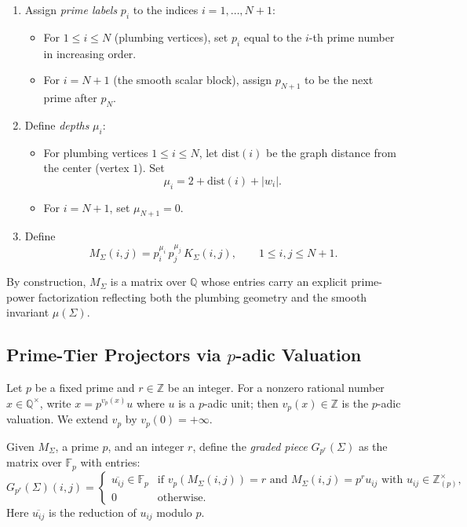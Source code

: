 \documentclass[11pt]{article}
\begin{document}
\begin{enumerate}[label=(\alph*),leftmargin=1.5em]
  \item Assign \emph{prime labels} $p_i$ to the indices $i=1,\dots,N+1$:
  \begin{itemize}[leftmargin=1em]
    \item For $1\le i\le N$ (plumbing vertices), set $p_i$ equal to the $i$-th prime number in increasing order.
    \item For $i = N+1$ (the smooth scalar block), assign $p_{N+1}$ to be the next prime after $p_N$.
  \end{itemize}
  \item Define \emph{depths} $\mu_i$:
  \begin{itemize}[leftmargin=1em]
    \item For plumbing vertices $1\le i\le N$, let $\mathrm{dist}(i)$ be the graph distance from the center (vertex $1$). Set
    \[
      \mu_i = 2 + \mathrm{dist}(i) + |w_i|.
    \]
    \item For $i=N+1$, set $\mu_{N+1} = 0$.
  \end{itemize}
  \item Define
  \[
    M_\Sigma(i,j) = p_i^{\mu_i}\,p_j^{\mu_j}\,K_\Sigma(i,j),
    \qquad 1\le i,j\le N+1.
  \]
\end{enumerate}

By construction, $M_\Sigma$ is a matrix over $\mathbb Q$ whose entries carry an explicit prime-power factorization reflecting both the plumbing geometry and the smooth invariant $\mu(\Sigma)$.\cite{exotic-mult}

\subsection{Prime-Tier Projectors via \texorpdfstring{$p$}{p}-adic Valuation}

Let $p$ be a fixed prime and $r\in\mathbb Z$ be an integer. For a nonzero rational number $x\in\mathbb Q^\times$, write $x = p^{v_p(x)} u$ where $u$ is a $p$-adic unit; then $v_p(x)\in\mathbb Z$ is the $p$-adic valuation. We extend $v_p$ by $v_p(0)=+\infty$.

\begin{definition}
Given $M_\Sigma$, a prime $p$, and an integer $r$, define the \emph{graded piece} $G_{p^r}(\Sigma)$ as the matrix over $\mathbb F_p$ with entries:
\[
  G_{p^r}(\Sigma)(i,j) =
  \begin{cases}
    \overline{u_{ij}} \in \mathbb F_p & \text{if } v_p(M_\Sigma(i,j)) = r
    \text{ and } M_\Sigma(i,j) = p^r u_{ij}\text{ with }u_{ij}\in\mathbb Z_{(p)}^\times,\\[0.3em]
    0 & \text{otherwise.}
  \end{cases}
\]
Here $\overline{u_{ij}}$ is the reduction of $u_{ij}$ modulo $p$.
\end{definition}
\end{document}
